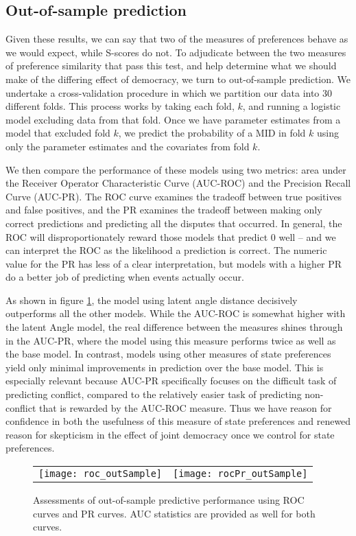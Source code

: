\subsection*{Out-of-sample prediction}

Given these results, we can say that two of the measures of preferences behave as we would expect, while S-scores do not. To adjudicate between the two measures of preference similarity that pass this test, and help determine what we should make of the differing effect of democracy, we turn to out-of-sample prediction. We undertake a cross-validation procedure in which we partition our data into 30 different folds. This process works by taking each fold, $k$, and running a logistic model excluding data from that fold. Once we have parameter estimates from a model that excluded fold $k$, we predict the probability of a MID in fold $k$ using only the parameter estimates and the covariates from fold $k$.

We then compare the performance of these models using two metrics: area under the Receiver Operator Characteristic Curve (AUC-ROC) and the Precision Recall Curve (AUC-PR). The ROC curve examines the tradeoff between true positives and false positives, and the PR examines the tradeoff between making only correct predictions and predicting all the disputes that occurred. In general, the ROC will disproportionately reward those models that predict $0$ well -- and we can interpret the ROC as the likelihood a prediction is correct. The numeric value for the PR has less of a clear interpretation, but models with a higher PR do a better job of predicting when events actually occur.

As shown in figure \ref{fig:roc}, the model using latent angle distance decisively outperforms all the other models. While the AUC-ROC is somewhat higher with the latent Angle model, the real difference between the measures shines through in the AUC-PR, where the model using this measure performs twice as well as the base model. In contrast, models using other measures of state preferences yield only minimal improvements in prediction over the base model. This is especially relevant because AUC-PR specifically focuses on the difficult task of predicting conflict, compared to the relatively easier task of predicting non-conflict that is rewarded by the AUC-ROC measure. Thus we have reason for confidence in both the usefulness of this measure of state preferences and renewed reason for skepticism in the effect of joint democracy once we control for state preferences. 

\begin{figure}[ht]
	\centering
	\begin{tabular}{cc}
	\texttt{[image: roc\_outSample]} & 
	\texttt{[image: rocPr\_outSample]}	
	\end{tabular}
	\caption{Assessments of out-of-sample predictive performance using ROC curves and PR curves. AUC statistics are provided as well for both curves.}
	\label{fig:roc}
\end{figure}
\FloatBarrier
